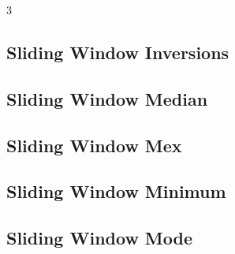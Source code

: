 \documentclass[8pt]{extarticle}
\begin{document}
\begin{multicols*}{3}
\subsection{Sliding Window Inversions}
\begin{caixaenunciado}

\end{caixaenunciado}
\vspace{0.3cm}


\subsection{Sliding Window Median}
\begin{caixaenunciado}

\end{caixaenunciado}
\vspace{0.3cm}


\subsection{Sliding Window Mex}
\begin{caixaenunciado}

\end{caixaenunciado}
\vspace{0.3cm}


\subsection{Sliding Window Minimum}
\begin{caixaenunciado}

\end{caixaenunciado}
\vspace{0.3cm}


\subsection{Sliding Window Mode}
\begin{caixaenunciado}

\end{caixaenunciado}
\vspace{0.3cm}



\end{multicols*}
\end{document}
